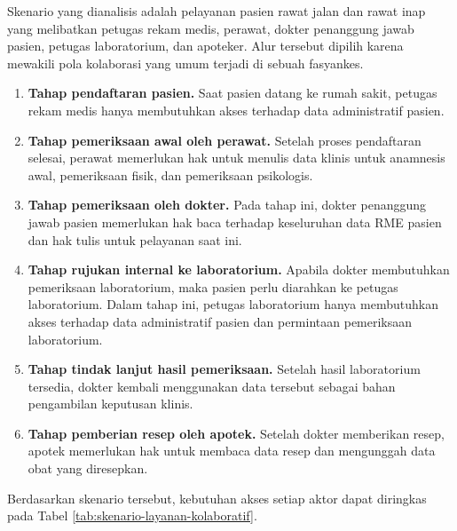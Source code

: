 \documentclass[bahasa, 12pt, a4paper, onecolumn, oneside, final]{report}
\begin{document}
Skenario yang dianalisis adalah pelayanan pasien rawat jalan dan rawat inap yang melibatkan petugas rekam medis, perawat, dokter penanggung jawab pasien, petugas laboratorium, dan apoteker. Alur tersebut dipilih karena mewakili pola kolaborasi yang umum terjadi di sebuah fasyankes.

\begin{enumerate}[]
	\item \textbf{Tahap pendaftaran pasien.} Saat pasien datang ke rumah sakit, petugas rekam medis hanya membutuhkan akses terhadap data administratif pasien.
	\item \textbf{Tahap pemeriksaan awal oleh perawat.} Setelah proses pendaftaran selesai, perawat memerlukan hak untuk menulis data klinis untuk anamnesis awal, pemeriksaan fisik, dan pemeriksaan psikologis.
	\item \textbf{Tahap pemeriksaan oleh dokter.} Pada tahap ini, dokter penanggung jawab pasien memerlukan hak baca terhadap keseluruhan data RME pasien dan hak tulis untuk pelayanan saat ini.
	\item \textbf{Tahap rujukan internal ke laboratorium.} Apabila dokter membutuhkan pemeriksaan laboratorium, maka pasien perlu diarahkan ke petugas laboratorium. Dalam tahap ini, petugas laboratorium hanya membutuhkan akses terhadap data administratif pasien dan permintaan pemeriksaan laboratorium.
	\item \textbf{Tahap tindak lanjut hasil pemeriksaan.} Setelah hasil laboratorium tersedia, dokter kembali menggunakan data tersebut sebagai bahan pengambilan keputusan klinis.
	\item \textbf{Tahap pemberian resep oleh apotek.} Setelah dokter memberikan resep, apotek memerlukan hak untuk membaca data resep dan mengunggah data obat yang diresepkan.
\end{enumerate}

Berdasarkan skenario tersebut, kebutuhan akses setiap aktor dapat diringkas pada Tabel \ref{tab:skenario-layanan-kolaboratif}.
\end{document}
